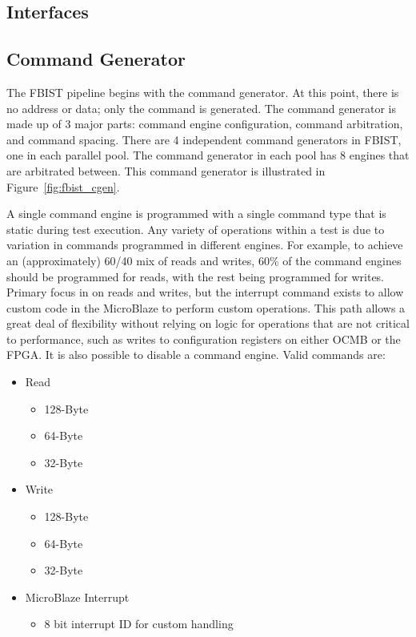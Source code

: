 \subsection{Interfaces}

\subsection{Command Generator}
The FBIST pipeline begins with the command generator. At this point,
there is no address or data; only the command is generated. The
command generator is made up of 3 major parts: command engine
configuration, command arbitration, and command spacing. There are 4
independent command generators in FBIST, one in each parallel
pool. The command generator in each pool has 8 engines that are
arbitrated between. This command generator is illustrated in
Figure~\ref{fig:fbist_cgen}.

A single command engine is programmed with a single command type that
is static during test execution. Any variety of operations within a
test is due to variation in commands programmed in different
engines. For example, to achieve an (approximately) 60/40 mix of reads
and writes, 60\% of the command engines should be programmed for
reads, with the rest being programmed for writes. Primary focus in on
reads and writes, but the interrupt command exists to allow custom
code in the MicroBlaze to perform custom operations. This path allows
a great deal of flexibility without relying on logic for operations
that are not critical to performance, such as writes to configuration
registers on either OCMB or the FPGA. It is also possible to disable a
command engine. Valid commands are:
\begin{itemize}
  \item Read
  \begin{itemize}
    \item 128-Byte
    \item 64-Byte
    \item 32-Byte
  \end{itemize}
  \item Write
  \begin{itemize}
    \item 128-Byte
    \item 64-Byte
    \item 32-Byte
  \end{itemize}
  \item MicroBlaze Interrupt
  \begin{itemize}
    \item 8 bit interrupt ID for custom handling
  \end{itemize}
\end{itemize}

